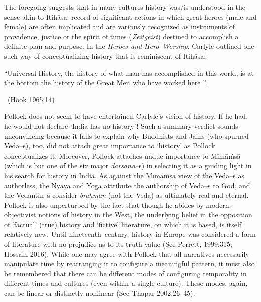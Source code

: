 The foregoing suggests that in many cultures history was/is understood in the sense akin to Itihāsa: record of significant actions in which great heroes (male and female) are often implicated and are variously recognized as instruments of providence, justice or the spirit of times (\textit{Zeitgeist}) destined to accomplish a definite plan and purpose. In the \textit{Heroes and Hero–Worship}, Carlyle outlined one such way of conceptualizing history that is reminiscent of Itihāsa:

\begin{myquote}
“Universal History, the history of what man has accomplished in this world, is at the bottom the history of the Great Men who have worked here ”.

~\hfill (Hook 1965:14)
\end{myquote}

Pollock does not seem to have entertained Carlyle’s vision of history. If he had, he would not declare ‘India has no history’! Such a summary verdict sounds unconvincing because it fails to explain why Buddhists and Jains (who spurned Veda–s), too, did not attach great importance to ‘history’ as Pollock conceptualizes it. Moreover, Pollock attaches undue importance to Mīmāṁsā (which is but one of the six major \textit{darśana–}s) in selecting it as a guiding light in his search for history in India. As against the Mīmāṁsā view of the Veda–s as authorless, the Nyāya and Yoga attribute the authorship of Veda–s to God, and the Vedantin–s consider \textit{brahman} (not the Veda) as ultimately real and eternal. Pollock is also unperturbed by the fact that though he abides by modern, objectivist notions of history in the West, the underlying belief in the opposition of ‘factual’ (true) history and ‘fictive’ literature, on which it is based, is itself relatively new. Until nineteenth–century, history in Europe was considered a form of literature with no prejudice as to its truth value (See Perrett, 1999:315; Hossain 2016). While one may agree with Pollock that all narratives necessarily manipulate time by rearranging it to configure a meaningful pattern, it must also be remembered that there can be different modes of configuring temporality in different times and cultures (even within a single culture). These modes, again, can be linear or distinctly nonlinear (See Thapar 2002:26–45).


